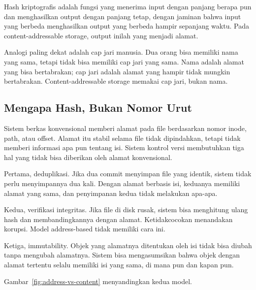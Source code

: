 \documentclass[11pt,a4paper]{article}
\begin{document}
Hash kriptografis adalah fungsi yang menerima input dengan panjang berapa pun dan menghasilkan output dengan panjang tetap, dengan jaminan bahwa input yang berbeda menghasilkan output yang berbeda hampir sepanjang waktu. Pada content-addressable storage, output inilah yang menjadi alamat.

Analogi paling dekat adalah cap jari manusia. Dua orang bisa memiliki nama yang sama, tetapi tidak bisa memiliki cap jari yang sama. Nama adalah alamat yang bisa bertabrakan; cap jari adalah alamat yang hampir tidak mungkin bertabrakan. Content-addressable storage memakai cap jari, bukan nama.

\subsection{Mengapa Hash, Bukan Nomor Urut}

Sistem berkas konvensional memberi alamat pada file berdasarkan nomor inode, path, atau offset. Alamat itu stabil selama file tidak dipindahkan, tetapi tidak memberi informasi apa pun tentang isi. Sistem kontrol versi membutuhkan tiga hal yang tidak bisa diberikan oleh alamat konvensional.

Pertama, deduplikasi. Jika dua commit menyimpan file yang identik, sistem tidak perlu menyimpannya dua kali. Dengan alamat berbasis isi, keduanya memiliki alamat yang sama, dan penyimpanan kedua tidak melakukan apa-apa.

Kedua, verifikasi integritas. Jika file di disk rusak, sistem bisa menghitung ulang hash dan membandingkannya dengan alamat. Ketidakcocokan menandakan korupsi. Model address-based tidak memiliki cara ini.

Ketiga, immutability. Objek yang alamatnya ditentukan oleh isi tidak bisa diubah tanpa mengubah alamatnya. Sistem bisa mengasumsikan bahwa objek dengan alamat tertentu selalu memiliki isi yang sama, di mana pun dan kapan pun.

Gambar~\ref{fig:address-vs-content} menyandingkan kedua model.
\end{document}
